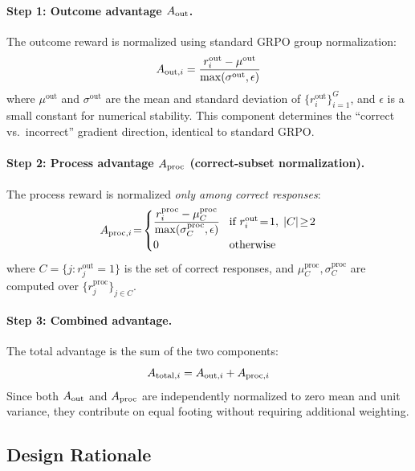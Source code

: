 \paragraph{Step 1: Outcome advantage $\aout$.} The outcome reward is normalized using standard GRPO group normalization:
\begin{equation}
\label{eq:a-out}
\aout[i] = \frac{r_i^{\text{out}} - \mu^{\text{out}}}{\max(\sigma^{\text{out}}, \epsilon)}
\end{equation}
where $\mu^{\text{out}}$ and $\sigma^{\text{out}}$ are the mean and standard deviation of $\{r_i^{\text{out}}\}_{i=1}^G$, and $\epsilon$ is a small constant for numerical stability. This component determines the ``correct vs.\ incorrect'' gradient direction, identical to standard GRPO.

\paragraph{Step 2: Process advantage $\aproc$ (correct-subset normalization).}
The process reward is normalized \emph{only among correct responses}:
\begin{equation}
\label{eq:a-proc}
\aproc[i] \!=\! \begin{cases}
\displaystyle\frac{r_i^{\text{proc}} - \mu_C^{\text{proc}}}{\max(\sigma_C^{\text{proc}}, \epsilon)} & \!\text{if } r_i^{\text{out}} \!=\! 1,\; |C| \!\geq\! 2 \\[6pt]
0 & \!\text{otherwise}
\end{cases}
\end{equation}
where $C = \{j : r_j^{\text{out}} = 1\}$ is the set of correct responses, and $\mu_C^{\text{proc}}, \sigma_C^{\text{proc}}$ are computed over $\{r_j^{\text{proc}}\}_{j \in C}$.

\paragraph{Step 3: Combined advantage.} The total advantage is the sum of the two components:
\begin{equation}
\label{eq:a-total}
\atotal[i] = \aout[i] + \aproc[i]
\end{equation}
Since both $\aout$ and $\aproc$ are independently normalized to zero mean and unit variance, they contribute on equal footing without requiring additional weighting.

\subsection{Design Rationale}
\label{sec:rationale}

